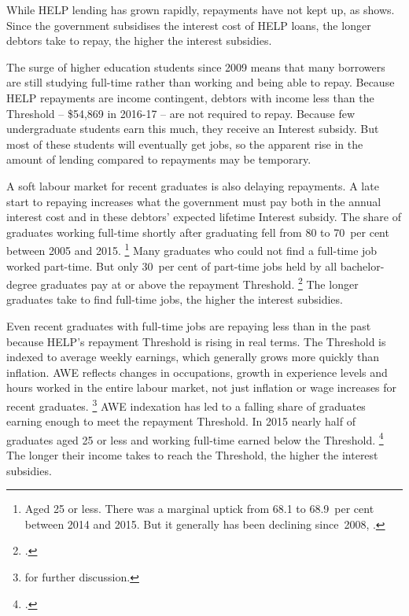 \documentclass{grattan}
\begin{document}
While \gls{HELP} lending has grown rapidly, repayments have not kept up, as  shows.
Since the government subsidises the interest cost of \gls{HELP} loans, the longer debtors take to repay, the higher the interest subsidies.

The surge of higher education students since 2009 means that many borrowers are still studying full-time rather than working and being able to repay.
Because \gls{HELP} repayments are income contingent, debtors with income less than the \gls{Threshold} -- \$54,869 in 2016-17 -- are not required to repay.
Because few undergraduate students earn this much, they receive an \gls{Interest subsidy}.
But most of these students will eventually get jobs, so the apparent rise in the amount of lending compared to repayments may be temporary.

A soft labour market for recent graduates is also delaying repayments.
A late start to repaying increases what the government must pay both in the annual interest cost and in these debtors' expected lifetime \gls{Interest subsidy}.
The share of graduates working full-time shortly after graduating fell from 80 to 70~per cent between 2005 and 2015.%
   \footnote{Aged 25 or less.
There was a marginal uptick from 68.1 to 68.9~per cent between 2014 and 2015.
But it generally has been declining since~2008, \textcite[][Figure~1]{GCA2015GradStatsemploymentsalary}.} Many graduates who could not find a full-time job worked part-time.
But only 30~per cent of part-time jobs held by all bachelor-degree graduates pay at or above the repayment \gls{Threshold}.%
\footcite[][Figure~7]{Norton2016HELPfuturefairer} 
The longer graduates take to find full-time jobs, the higher the interest subsidies.

Even recent graduates with full-time jobs are repaying less than in the past because \gls{HELP}'s repayment \gls{Threshold} is rising in real terms.
The \gls{Threshold} is indexed to average weekly earnings, which generally grows more quickly than inflation.
\gls{AWE} reflects changes in occupations, growth in experience levels and hours worked in the entire labour market, not just inflation or wage increases for recent graduates.%
   \footnote{\textcite[][Chapter~8]{Norton2016HELPfuturefairer} for further discussion.} \gls{AWE} indexation has led to a falling share of graduates earning enough to meet the repayment \gls{Threshold}.
In 2015 nearly half of graduates aged 25 or less and working full-time earned below the \gls{Threshold}.%
\footcite{GCA2015GradStatsemploymentsalary} 
The longer their income takes to reach the \gls{Threshold}, the higher the interest subsidies.
\end{document}
